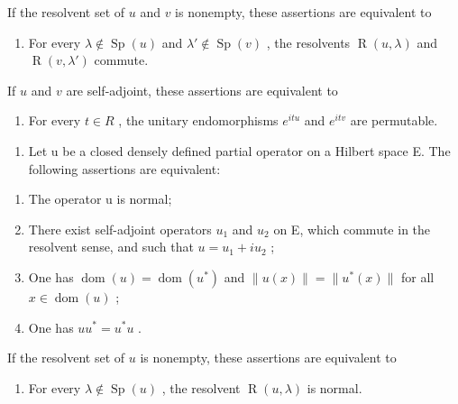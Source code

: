 If the resolvent set of \(u\) and \(v\) is nonempty, these assertions are equivalent to

\begin{enumerate}
\def\labelenumi{\alph{enumi})}
\setcounter{enumi}{2}
\tightlist
\item
  For every \(\lambda \notin \operatorname{Sp}(u)\) and \(\lambda' \notin \operatorname{Sp}(v)\) , the resolvents \(\operatorname{R}(u, \lambda)\) and \(\operatorname{R}(v, \lambda')\) commute.
\end{enumerate}

If \(u\) and \(v\) are self-adjoint, these assertions are equivalent to

\begin{enumerate}
\def\labelenumi{\alph{enumi})}
\setcounter{enumi}{3}
\tightlist
\item
  For every \(t \in R\) , the unitary endomorphisms \(e^{itu}\) and \(e^{itv}\) are permutable.
\end{enumerate}

\begin{enumerate}
\def\labelenumi{\arabic{enumi})}
\setcounter{enumi}{8}
\tightlist
\item
  Let u be a closed densely defined partial operator on a Hilbert space E. The following assertions are equivalent:
\end{enumerate}

\begin{enumerate}
\def\labelenumi{\alph{enumi})}
\item
  The operator u is normal;
\item
  There exist self-adjoint operators \(u_{1}\) and \(u_{2}\) on E, which commute in the resolvent sense, and such that \(u = u_{1} + iu_{2}\) ;
\item
  One has \(\operatorname{dom}(u) = \operatorname{dom}(u^*)\) and \(\| u(x)\| = \| u^{*}(x)\|\) for all \(x\in \operatorname{dom}(u)\) ;
\item
  One has \(uu^{*} = u^{*}u\) .
\end{enumerate}

If the resolvent set of \(u\) is nonempty, these assertions are equivalent to

\begin{enumerate}
\def\labelenumi{\alph{enumi})}
\setcounter{enumi}{4}
\tightlist
\item
  For every \(\lambda \notin \operatorname{Sp}(u)\) , the resolvent \(\operatorname{R}(u, \lambda)\) is normal.
\end{enumerate}


